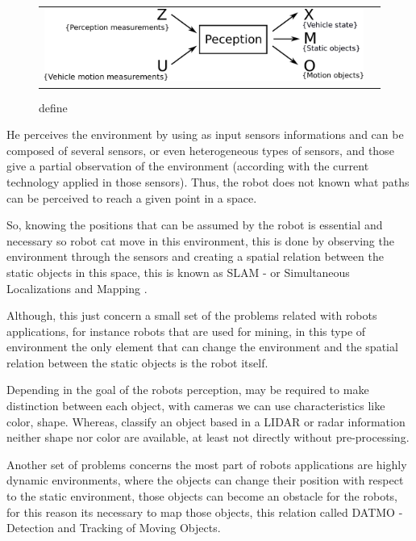 \begin{figure}[h]
   \centering
     \begin{tabular}{lr}
       \includegraphics[scale=0.5]{img/fig:perception:cycle}
     \end{tabular}
   \caption{define}
   \label{fig:perception:cycle}
 \end{figure}


He perceives the environment by using as input sensors informations and can be composed of several sensors, or even heterogeneous types of sensors, and those give a partial observation of the environment (according with the current technology applied in those sensors). Thus, the robot does not known what paths can be perceived to reach a given point in a space.

So, knowing the positions that can be assumed by the robot is essential and necessary so robot cat move in this environment, this is done by observing the environment through the sensors and creating a spatial relation between the static objects in this space, this is known as SLAM - or Simultaneous Localizations and Mapping \cite{iyengar1991autonomous}.

Although, this just concern a small set of the problems related with robots applications, for instance robots that are used for mining, in this type of environment the only element that can change the environment and the spatial relation between the static objects is the robot itself. 

Depending in the goal of the robots perception, may be required to make distinction between each object, with cameras we can use characteristics like color, shape. Whereas, classify an object based in a LIDAR or radar information neither shape nor color are available, at least not directly without pre-processing.

Another set of problems concerns the most part of robots applications are highly dynamic environments, where the objects can change their position with respect to the static environment, those objects can become an obstacle for the robots, for this reason its necessary to map those objects, this relation called DATMO - Detection and Tracking of Moving Objects.

